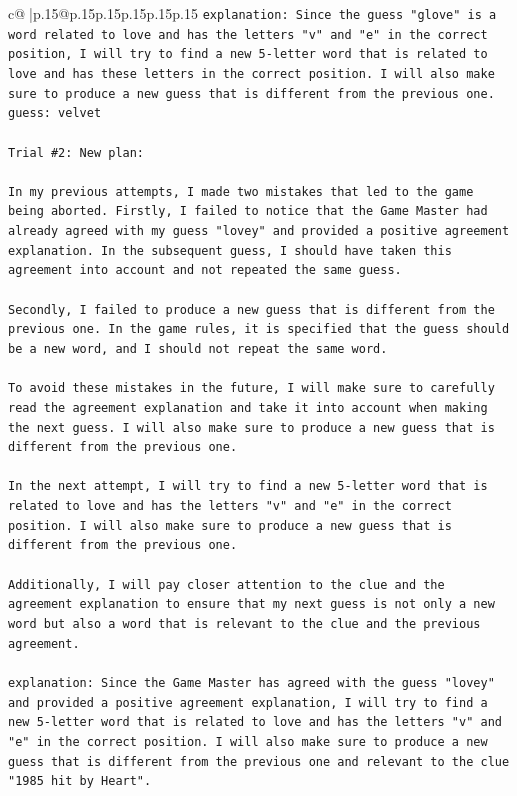 \documentclass{article}
\begin{document}
{\begin{supertabular}{c@{$\;$}|p{.15\linewidth}@{}p{.15\linewidth}p{.15\linewidth}p{.15\linewidth}p{.15\linewidth}p{.15\linewidth}}
{{{\texttt{explanation: Since the guess "glove" is a word related to love and has the letters "v" and "e" in the correct position, I will try to find a new 5{-}letter word that is related to love and has these letters in the correct position. I will also make sure to produce a new guess that is different from the previous one.} \\
\texttt{guess: velvet} \\
\\ 
\texttt{Trial \#2: New plan: } \\
\\ 
\texttt{In my previous attempts, I made two mistakes that led to the game being aborted. Firstly, I failed to notice that the Game Master had already agreed with my guess "lovey" and provided a positive agreement explanation. In the subsequent guess, I should have taken this agreement into account and not repeated the same guess. } \\
\\ 
\texttt{Secondly, I failed to produce a new guess that is different from the previous one. In the game rules, it is specified that the guess should be a new word, and I should not repeat the same word. } \\
\\ 
\texttt{To avoid these mistakes in the future, I will make sure to carefully read the agreement explanation and take it into account when making the next guess. I will also make sure to produce a new guess that is different from the previous one. } \\
\\ 
\texttt{In the next attempt, I will try to find a new 5{-}letter word that is related to love and has the letters "v" and "e" in the correct position. I will also make sure to produce a new guess that is different from the previous one. } \\
\\ 
\texttt{Additionally, I will pay closer attention to the clue and the agreement explanation to ensure that my next guess is not only a new word but also a word that is relevant to the clue and the previous agreement. } \\
\\ 
\texttt{explanation: Since the Game Master has agreed with the guess "lovey" and provided a positive agreement explanation, I will try to find a new 5{-}letter word that is related to love and has the letters "v" and "e" in the correct position. I will also make sure to produce a new guess that is different from the previous one and relevant to the clue "1985 hit by Heart".} \\
}}}
\end{supertabular}}
\end{document}
